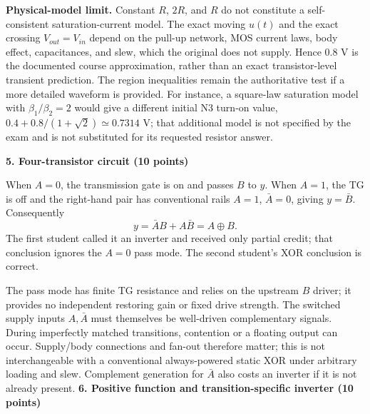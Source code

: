 \documentclass[10pt]{article}
\newcommand{\mos}[4]{\begin{scope}[shift={(#1,#2)}]
\draw (0,.24)--(0,-.24);\draw (0,.20)--(.25,.20)--(.25,.5);
\draw (0,-.20)--(.25,-.20)--(.25,-.5);\draw (-.16,.23)--(-.16,-.23);
\ifnum#4=1\draw (-.26,0) circle (.06);\draw (-.75,0)--(-.32,0);\else\draw (-.75,0)--(-.16,0);\fi
\node[anchor=east,font=\scriptsize] at (-.76,0) {$#3$};\end{scope}}
\begin{document}
\textbf{Physical-model limit.} Constant $R$, $2R$, and $R$ do not constitute a self-consistent saturation-current model. The exact moving $u(t)$ and the exact crossing $V_{out}=V_{in}$ depend on the pull-up network, MOS current laws, body effect, capacitances, and slew, which the original does not supply. Hence 0.8 V is the documented course approximation, rather than an exact transistor-level transient prediction. The region inequalities remain the authoritative test if a more detailed waveform is provided. For instance, a square-law saturation model with $\beta_1/\beta_2=2$ would give a different initial N3 turn-on value, $0.4+0.8/(1+\sqrt2)\simeq0.7314$ V; that additional model is not specified by the exam and is not substituted for its requested resistor answer.

\textbf{5. Four-transistor circuit (10 points)}
\begin{center}\end{center}
When $A=0$, the transmission gate is on and passes $B$ to $y$. When $A=1$, the TG is off and the right-hand pair has conventional rails $A=1$, $\bar A=0$, giving $y=\bar B$. Consequently
\[\boxed{y=\bar A B+A\bar B=A\oplus B.}\]
The first student called it an inverter and received only partial credit; that conclusion ignores the $A=0$ pass mode. The second student's XOR conclusion is correct.

The pass mode has finite TG resistance and relies on the upstream $B$ driver; it provides no independent restoring gain or fixed drive strength. The switched supply inputs $A,\bar A$ must themselves be well-driven complementary signals. During imperfectly matched transitions, contention or a floating output can occur. Supply/body connections and fan-out therefore matter; this is not interchangeable with a conventional always-powered static XOR under arbitrary loading and slew. Complement generation for $\bar A$ also costs an inverter if it is not already present.
\newpage
\textbf{6. Positive function and transition-specific inverter (10 points)}
\end{document}
